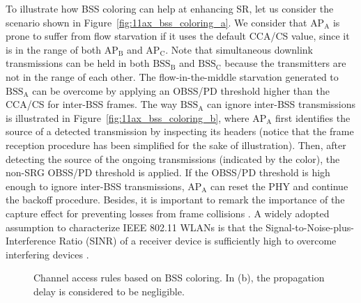 \documentclass[preprint,12pt]{elsarticle}
\theoremstyle{plain}
\begin{document}
To illustrate how BSS coloring can help at enhancing SR, let us consider the scenario shown in Figure~\ref{fig:11ax_bss_coloring_a}. We consider that $\text{AP}_\text{A}$ is prone to suffer from flow starvation if it uses the default CCA/CS value, since it is in the range of both $\text{AP}_\text{B}$ and $\text{AP}_\text{C}$. Note that simultaneous downlink transmissions can be held in both $\text{BSS}_\text{B}$ and $\text{BSS}_\text{C}$ because the transmitters are not in the range of each other. The flow-in-the-middle starvation generated to $\text{BSS}_\text{A}$ can be overcome by applying an OBSS/PD threshold higher than the CCA/CS for inter-BSS frames. The way $\text{BSS}_\text{A}$ can ignore inter-BSS transmissions is illustrated in Figure~\ref{fig:11ax_bss_coloring_b}, where $\text{AP}_\text{A}$ first identifies the source of a detected transmission by inspecting its headers (notice that the frame reception procedure has been simplified for the sake of illustration). Then, after detecting the source of the ongoing transmissions (indicated by the color), the non-SRG OBSS/PD threshold is applied. If the OBSS/PD threshold is high enough to ignore inter-BSS transmissions, $\text{AP}_\text{A}$ can reset the PHY and continue the backoff procedure. Besides, it is important to remark the importance of the capture effect for preventing losses from frame collisions \cite{lee2007experimental}. A widely adopted assumption to characterize IEEE 802.11 WLANs is that the Signal-to-Noise-plus-Interference Ratio (SINR) of a receiver device is sufficiently high to overcome interfering devices \cite{durvy2007modeling}.

\begin{figure}[ht!]
	\centering
	\hspace{1cm}
	\caption{Channel access rules based on BSS coloring. In (b), the propagation delay is considered to be negligible.}
\end{figure}
\end{document}
